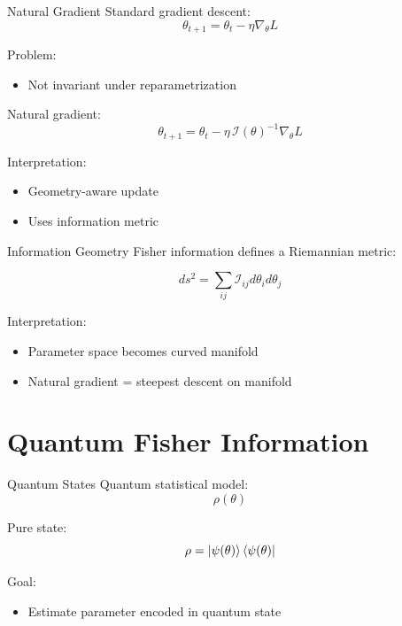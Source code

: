 \documentclass{beamer}
\begin{document}
\begin{frame}{Natural Gradient}
Standard gradient descent:
\[
\theta_{t+1} = \theta_t - \eta \nabla_\theta L
\]

\pause

Problem:
\begin{itemize}
\item Not invariant under reparametrization
\end{itemize}

\pause

Natural gradient:
\[
\theta_{t+1} 
= \theta_t - \eta \, \mathcal{I}(\theta)^{-1} \nabla_\theta L
\]

\pause

Interpretation:
\begin{itemize}
\item Geometry-aware update
\item Uses information metric
\end{itemize}

\end{frame}

\begin{frame}{Information Geometry}
Fisher information defines a Riemannian metric:

\[
ds^2 = \sum_{ij} \mathcal{I}_{ij} d\theta_i d\theta_j
\]

\pause

Interpretation:
\begin{itemize}
\item Parameter space becomes curved manifold
\item Natural gradient = steepest descent on manifold
\end{itemize}

\end{frame}

\section{Quantum Fisher Information}

\begin{frame}{Quantum States}
Quantum statistical model:
\[
\rho(\theta)
\]

Pure state:
\[
\rho = \ket{\psi(\theta)}\bra{\psi(\theta)}
\]

\pause

Goal:
\begin{itemize}
\item Estimate parameter encoded in quantum state
\end{itemize}

\end{frame}
\end{document}

